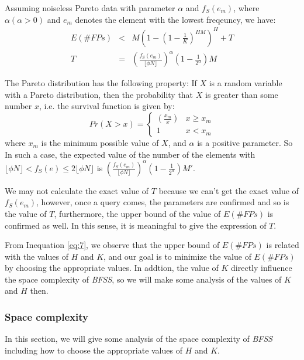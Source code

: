 \documentclass[conference]{IEEEtran}
\begin{document}
\begin{theorem}\label{thm:3}
Assuming noiseless Pareto data with parameter $\alpha$ and $f_S(e_m)$, where $\alpha (\alpha >0)$ and $e_m$ denotes the element with the lowest freqeuncy, we have:
\setlength{\arraycolsep}{0.0em}
\begin{eqnarray}
	E(\#FPs)&<&M(1-(1-\frac{1}{K})^{HM})^H + T\\
	T&=&(\frac{f_S(e_m)}{\lfloor \phi N\rfloor})^\alpha(1-\frac{1}{2^\alpha})M\label{eq:10}
\end{eqnarray}
\setlength{\arraycolsep}{5pt}
\end{theorem}

\begin{IEEEproof}
The Pareto distribution has the following property: If $X$ is a random variable with a Pareto distribution, then the probability that $X$ is greater than some number $x$, i.e. the survival function is given by:
$$Pr(X>x)=
\begin{cases}
(\frac{x_m}{x}) & x\geq x_m\\
1 & x<x_m
\end{cases}$$
where $x_m$ is the minimum possible value of $X$, and $\alpha$ is a positive parameter. So In such a case, the expected value of the number of the elements with $\lfloor \phi N\rfloor<f_S(e)\leq 2\lfloor\phi N\rfloor$ is $(\frac{f_S(e_m)}{\lfloor \phi N\rfloor})^\alpha(1-\frac{1}{2^\alpha})M'$.
\end{IEEEproof}
We may not calculate the exact value of $T$ because we can't get the exact value of $f_S(e_m)$, however, once a query comes, the parameters are confirmed and so is the value of $T$, furthermore, the upper bound of the value of $E(\#FPs)$ is confirmed as well. In this sense, it is meaningful to give the expression of $T$.\par
From Inequation \ref{eq:7}, we observe that the upper bound of $E(\#FPs)$ is related with the values of $H$ and $K$, and our goal is to minimize the value of  $E(\#FPs)$ by choosing the appropriate values. In addtion, the value of $K$ directly influence the space complexity of \emph{BFSS}, so we will make some analysis of the values of $K$ and $H$ then.


\subsubsection{\textbf{Space complexity}}\label{sec:space}
In this section, we will give some analysis of the space complexity of \emph{BFSS} including how to choose the appropriate values of $H$ and $K$.
\end{document}
